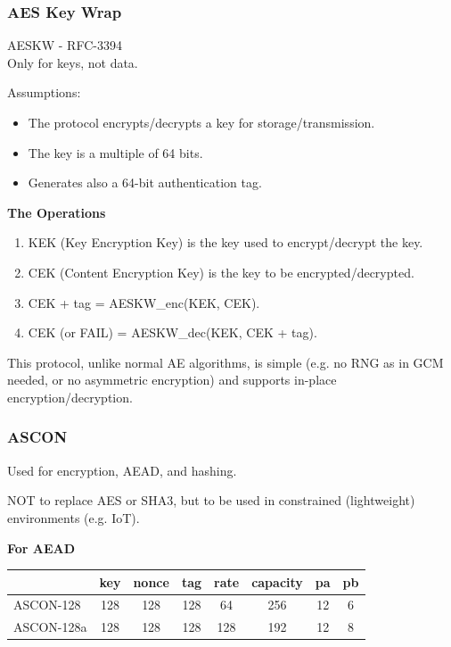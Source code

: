 \subsubsection{AES Key Wrap}
\begin{center}
    AESKW - RFC-3394 \\ Only for keys, not data.
\end{center}
Assumptions:
\begin{itemize}
    \item The protocol encrypts/decrypts a key for storage/transmission.
    \item The key is a multiple of 64 bits.
    \item Generates also a 64-bit authentication tag.
\end{itemize}

\begin{center}
    \textbf{The Operations}
\end{center}
\begin{enumerate}
    \item KEK (Key Encryption Key) is the key used to encrypt/decrypt the key.
    \item CEK (Content Encryption Key) is the key to be encrypted/decrypted.
    \item {CEK} + tag = AESKW\_enc(KEK, CEK).
    \item CEK (or FAIL) = AESKW\_dec(KEK, {CEK} + tag).
\end{enumerate}
This protocol, unlike normal AE algorithms, is simple (e.g. no RNG as in GCM needed, or no asymmetric encryption) and supports in-place encryption/decryption.

\subsubsection{ASCON}
\begin{center}
    Used for encryption, AEAD, and hashing.
\end{center}
NOT to replace AES or SHA3, but to be used in constrained (lightweight) environments (e.g. IoT).
\begin{center}
    \textbf{For AEAD}
\end{center}

\begin{table}[H]
    \centering
    \begin{tabular}{lccccccc}
        \toprule
        \textbf{} & \textbf{key} & \textbf{nonce} & \textbf{tag} & \textbf{rate} & \textbf{capacity} & \textbf{pa} & \textbf{pb} \\
        \midrule
        ASCON-128  & 128 & 128 & 128 & 64  & 256 & 12 & 6 \\
        ASCON-128a & 128 & 128 & 128 & 128 & 192 & 12 & 8 \\
        \bottomrule
    \end{tabular}
\end{table}

